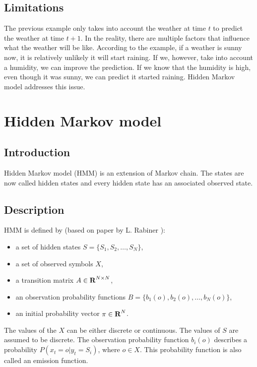 \documentclass[thesis=B,english]{FITthesis}[2012/06/26]
\begin{document}
\subsection{Limitations}

The previous example only takes into account the weather at time $t$ to predict the weather at time $t+1$. In the reality, there are multiple factors that influence what the weather will be like. According to the example, if a weather is sunny now, it is relatively unlikely it will start raining. If we, however, take into account a humidity, we can improve the prediction. If we know that the humidity is high, even though it was sunny, we can predict it started raining. Hidden Markov model addresses this issue.

\section{Hidden Markov model}

\subsection{Introduction}

Hidden Markov model (HMM) is an extension of Markov chain. The states are now called hidden states and every hidden state has an associated observed state.

\subsection{Description}

HMM is defined by (based on paper by L. Rabiner \cite{hmm-lawrence}):
\begin{itemize}

\item a set of hidden states $S = \{S_1, S_2, \dots, S_N\}$,
\item a set of observed symbols $X$,
\item a transition matrix $A \in \textbf R^{N \times N}$,
\item an observation probability functions $B = \{b_1(o), b_2(o), \dots, b_N(o)\}$,
\item an initial probability vector $\pi \in \textbf R^N$.

\end{itemize}

The values of the $X$ can be either discrete or continuous. The values of $S$ are assumed to be discrete. The observation probability function $b_i(o)$ describes a probability $P(x_t = o | y_t = S_i)$, where $o \in X$. This probability function is also called an emission function.
\end{document}
